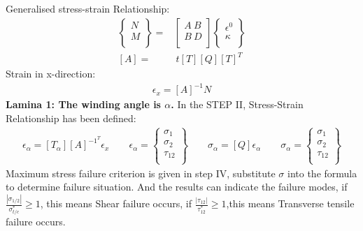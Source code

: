 \documentclass[12pt]{article}
\begin{document}
\noindent Generalised stress-strain Relationship:
\begin{equation}
	\begin{align}
 \left\{\begin{matrix}
    N \\
    M \\
    \end{matrix}\right\}=&\left[\begin{matrix}
        A\ B\\
        B\ D\\\end{matrix}\right]\left\{\begin{matrix}
        \epsilon^0 \\
        \kappa \\
		\end{matrix}\right\}\\
		\left[A\right]=&\ t\left[T\right]\left[Q\right]\left[T\right]^T
	\end{align}
\end{equation}
Strain in x-direction: \begin{equation}
	\begin{align}
		\epsilon_x = \left[A\right]^{-1}N
	\end{align}
\end{equation}
\noindent \textbf{Lamina 1: The winding angle is $\alpha$.}\newline
\noindent In the STEP II, Stress-Strain Relationship has been defined:\newline
\begin{equation}
	\begin{align}
\epsilon_\alpha = \left[T_\alpha\right]\left[A\right]^{-1}^T\epsilon_x\qquad
\epsilon_\alpha=\left\{ \begin{matrix}
    \sigma_1  \\
    \sigma_2  \\
    \tau_{12}  \\
	\end{matrix} \right\}\qquad\sigma_\alpha=\left[Q\right]\epsilon_\alpha\qquad\sigma_\alpha=\left\{ \begin{matrix}
		\sigma_1  \\
		\sigma_2  \\
		\tau_{12}  \\
		\end{matrix} \right\}
	\end{align}
\end{equation}
\noindent Maximum stress failure criterion is given in step IV, substitute $\sigma$ into the formula to determine failure situation. And the results can indicate the failure modes, if $\frac{\left| \sigma_{1/2} \right|}{\sigma^*_{t/c}} \geq 1 $, this means Shear failure occurs, if $ \frac{\left| \tau_{12} \right|}{\tau^*_{12}} \geq 1 $,this means Transverse tensile failure occurs.\newline
\end{document}
